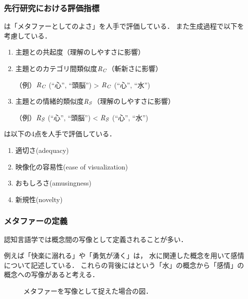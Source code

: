 \documentclass[12pt,usepdftitle=false]{beamer}
\begin{document}
\begin{frame}
    \frametitle{先行研究における評価指標}
    \citet{jakitada2001}は「メタファーとしてのよさ」を人手で評価している．
    また生成過程で以下を考慮している．
    \begin{enumerate}
        \item 主題との共起度（理解のしやすさに影響）
        \item 主題とのカテゴリ間類似度$\text{\emph{R}}_\text{\emph{C}}$（斬新さに影響）

            （例）$\text{\emph{R}}_\text{\emph{C}}$ (``心'', ``頭脳'') > $\text{\emph{R}}_\text{\emph{C}}$ (``心'', ``水'')

        \item 主題との情緒的類似度$\text{\emph{R}}_\text{\emph{S}}$（理解のしやすさに影響）

            （例）$\text{\emph{R}}_\text{\emph{S}}$ (``心'', ``頭脳'') < $\text{\emph{R}}_\text{\emph{S}}$ (``心'', ``水'')
    \end{enumerate}

    \bigskip

    \citet{abe2006}は以下の4点を人手で評価している．
    \begin{enumerate}
        \item 適切さ(adequacy)

        \item 映像化の容易性(ease of visualization)

        \item おもしろさ(amusingness)

        \item 新規性(novelty)

    \end{enumerate}
\end{frame}

\begin{frame}
    \frametitle{メタファーの定義}

    認知言語学では概念間の写像として定義されることが多い\citep{lakoff1999}．

    \bigskip

    例えば「快楽に溺れる」や「勇気が湧く」は，
    水に関連した概念を用いて感情について記述している．
    これらの背後にはという「水」の概念から「感情」の概念への写像があると考える．

    \bigskip

     \begin{figure}[b]
         \caption{メタファーを写像として捉えた場合の図．}
     \end{figure}

\end{frame}
\end{document}
